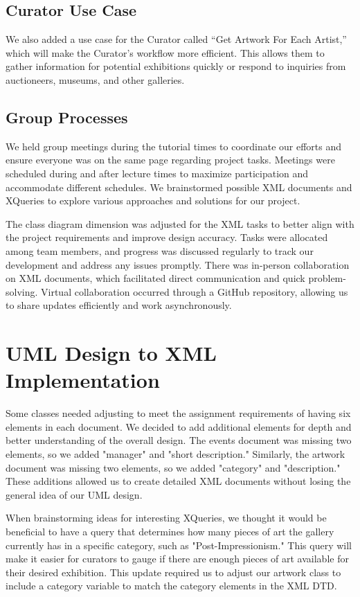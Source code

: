 \documentclass{article} %
\begin{document}
\subsection{Curator Use Case}

We also added a use case for the Curator called “Get Artwork For Each Artist,” which 
will make the Curator's workflow more efficient. This allows them to gather information 
for potential exhibitions quickly or respond to inquiries from auctioneers, museums, and 
other galleries.

\subsection{Group Processes}
We held group meetings during the tutorial times to coordinate our efforts and ensure 
everyone was on the same page regarding project tasks. Meetings were scheduled during 
and after lecture times to maximize participation and accommodate different schedules. 
We brainstormed possible XML documents and XQueries to explore various approaches and 
solutions for our project.

The class diagram dimension was adjusted for the XML tasks to better align with the 
project requirements and improve design accuracy. Tasks were allocated among team 
members, and progress was discussed regularly to track our development and address any 
issues promptly. There was in-person collaboration on XML documents, which facilitated 
direct communication and quick problem-solving. Virtual collaboration occurred through 
a GitHub repository, allowing us to share updates efficiently and work asynchronously.

\section{UML Design to XML Implementation}
Some classes needed adjusting to meet the assignment requirements of having six 
elements in each document. We decided to add additional elements for depth and better 
understanding of the overall design. The events document was missing two elements, so 
we added "manager" and "short description." Similarly, the artwork document was 
missing two elements, so we added "category" and "description." These additions 
allowed us to create detailed XML documents without losing the general idea of our UML 
design.

When brainstorming ideas for interesting XQueries, we thought it would be beneficial 
to have a query that determines how many pieces of art the gallery currently has in 
a specific category, such as "Post-Impressionism." This query will make it easier for 
curators to gauge if there are enough pieces of art available for their desired 
exhibition. This update required us to adjust our artwork class to include a category 
variable to match the category elements in the XML DTD.
\end{document}
